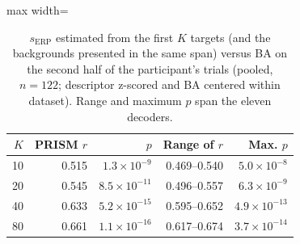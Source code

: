 \begin{table}[H]
\centering
\caption{$s_\mathrm{ERP}$ estimated from the first $K$ targets (and the backgrounds presented in the same span) versus BA on the second half of the participant's trials (pooled, $n=122$; descriptor z-scored and BA centered within dataset). Range and maximum $p$ span the eleven decoders.}
\label{tab:supp-serp-calibration}
\footnotesize
\begin{adjustbox}{max width=\textwidth}
\begin{tabular}{@{}rrrrr@{}}
\toprule
$K$ & PRISM $r$ & $p$ & Range of $r$ & Max. $p$ \\
\midrule
10 & 0.515 & $1.3\times10^{-9}$ & 0.469--0.540 & $5.0\times10^{-8}$ \\
20 & 0.545 & $8.5\times10^{-11}$ & 0.496--0.557 & $6.3\times10^{-9}$ \\
40 & 0.633 & $5.2\times10^{-15}$ & 0.595--0.652 & $4.9\times10^{-13}$ \\
80 & 0.661 & $1.1\times10^{-16}$ & 0.617--0.674 & $3.7\times10^{-14}$ \\
\bottomrule
\end{tabular}
\end{adjustbox}
\end{table}
